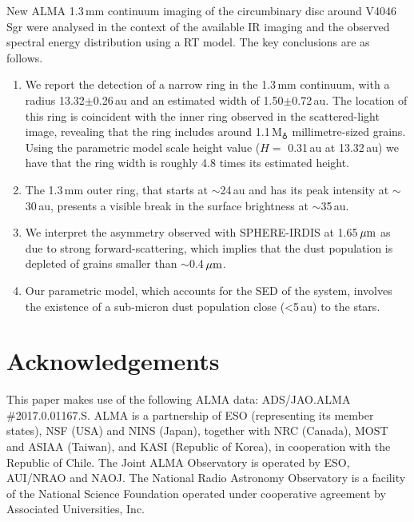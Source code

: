 \documentclass[letters,usenatbib,times]{mnras}
\begin{document}
New ALMA 1.3\,mm continuum imaging of the circumbinary disc around V4046\,Sgr were analysed in the context of the available IR imaging and the observed spectral energy distribution using a RT model. The key conclusions are as follows.
\begin{enumerate}
  \item We report the detection of a narrow ring in the 1.3\,mm continuum, with a radius 13.32$\pm$0.26\,au and an estimated width of 1.50$\pm$0.72\,au. The location of this ring is coincident with the inner ring observed in the scattered-light image, revealing that the ring includes around 1.1\,M$_{\earth}$ millimetre-sized grains. Using the parametric model scale height value ($H= $ 0.31\,au at 13.32\,au) we have that the ring width is roughly 4.8 times its estimated height.
  
  \item The 1.3\,mm outer ring, that starts at $\sim$24\,au and has its peak intensity at $\sim$30\,au, presents a visible break in the surface brightness at $\sim$35\,au. 
  
  \item We interpret the asymmetry observed with SPHERE-IRDIS at 1.65\,$\hbox{$\mu$m}$ as due to strong forward-scattering, which implies that the dust population is depleted of grains smaller than $\sim$0.4\,$\hbox{$\mu$m}$.
  
  \item Our parametric model, which accounts for the SED of the system, involves the existence of a sub-micron dust population close (<5\,au) to the stars.
    
\end{enumerate}



 \section*{Acknowledgements}

This paper makes use of the following ALMA data: ADS/JAO.ALMA \#2017.0.01167.S. ALMA is a partnership of ESO (representing its member states), NSF (USA) and NINS (Japan), together with NRC (Canada), MOST and ASIAA (Taiwan), and KASI (Republic of Korea), in cooperation with the Republic of Chile. The Joint ALMA Observatory is operated by ESO, AUI/NRAO and NAOJ. The National Radio Astronomy Observatory is a facility of the National Science Foundation operated under cooperative agreement by Associated Universities, Inc.
 
\end{document}
